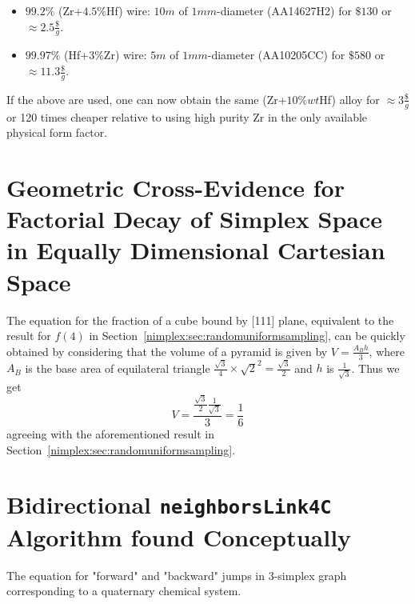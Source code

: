 \begin{itemize}
    \item $99.2\%$ (Zr+$4.5\%$Hf) wire: $10m$ of $1mm$-diameter  (AA14627H2) for $\$130$ or $\approx 2.5\frac{\$}{g}$. 
    \item $99.97\%$ (Hf+$3\%$Zr) wire: $5m$ of $1mm$-diameter (AA10205CC) for $\$580$ or $\approx 11.3\frac{\$}{g}$. 
\end{itemize}

If the above are used, one can now obtain the same (Zr+$10\%wt$Hf) alloy for $\approx 3\frac{\$}{g}$ or 120 times cheaper relative to using high purity Zr in the only available physical form factor.
    

\section{Geometric Cross-Evidence for Factorial Decay of Simplex Space in Equally Dimensional Cartesian Space}  \label{nimplex:app2}

The equation for the fraction of a cube bound by [111] plane, equivalent to the result for $f(4)$ in Section~\ref{nimplex:sec:randomuniformsampling}, can be quickly obtained by considering that the volume of a pyramid is given by $V = \frac{A_B h}{3}$, where $A_B$ is the base area of equilateral triangle $\frac{\sqrt{3}}{4}\times\sqrt{2}^2 = \frac{\sqrt{3}}{2}$ and $h$ is $\frac{1}{\sqrt{3}}$. Thus we get 
$$V = \frac{\frac{\sqrt{3}}{2} \frac{1}{\sqrt{3}}}{3} = \frac{1}{6}$$ 
agreeing with the aforementioned result in Section~\ref{nimplex:sec:randomuniformsampling}.


\section{Bidirectional \texttt{neighborsLink4C} Algorithm found Conceptually}  \label{nimplex:app3}

The equation for "forward" and "backward" jumps in 3-simplex graph corresponding to a quaternary chemical system. 

